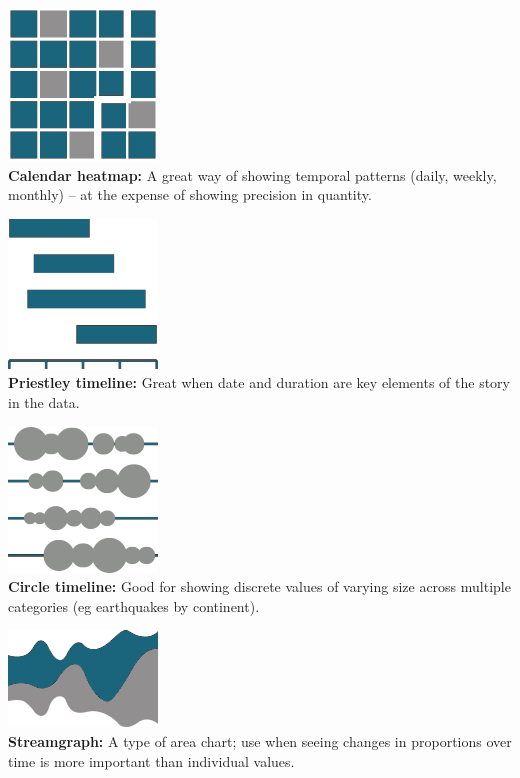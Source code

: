\documentclass[
  a4paper,
  onecolumn,
  oneside]{book}
\begin{document}
\includegraphics{part1/images/changeovertime8.png}\\
\textbf{Calendar heatmap:} A great way of showing temporal patterns
(daily, weekly, monthly) -- at the expense of showing precision in
quantity.

\includegraphics{part1/images/changeovertime9.png}\\
\textbf{Priestley timeline:} Great when date and duration are key
elements of the story in the data.

\includegraphics{part1/images/changeovertime10.png}\\
\textbf{Circle timeline:} Good for showing discrete values of varying
size across multiple categories (eg earthquakes by continent).

\includegraphics{part1/images/changeovertime11.png}\\
\textbf{Streamgraph:} A type of area chart; use when seeing changes in
proportions over time is more important than individual values.
\end{document}
